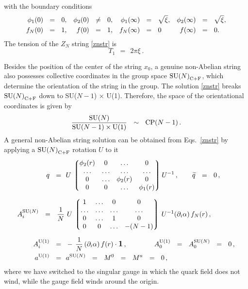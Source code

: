 \documentclass[12pt]{article}
\def\beq{\begin{equation}}
\def\eeq{\end{equation}}
\newcommand{\p}{\partial}
\newcommand{\wt}{\widetilde}
\newcommand{\lgr}{\left\lgroup}
\newcommand{\rgr}{\right\rgroup}
\def\cfl {$\text{SU($N$)}_{\rm C+F}$ }
\def\cfln {$\text{SU($N$)}_{\rm C+F}$}
\newcommand{\aU}{a^{\rm U(1)}}
\newcommand{\aN}{a^\text{SU($N$)}}
\begin{document}
	with the boundary conditions
\begin{align}
%
\label{boundary}
	\phi_1(0) & ~~=~~  0\text,                   & \phi_2(0) & ~~\neq~~ 0\text,  &
	\phi_1(\infty) & ~~=~~ \sqrt{\xi} \text,     & \phi_2(\infty) & ~~=~~ \sqrt{\xi}\text, \\
%
\notag
	f_{N}(0) & ~~=~~ 1\text,                   & f(0) & ~~=~~ 1\text,   &
	f_{N}(\infty) & ~~=~~ 0 \text\,            &  f(\infty) & ~~=~~ 0\text.
\end{align}
	The tension of the $ Z_N $ string \eqref{znstr} is 
\[
	T_1  ~~=~~ 2\pi\xi~.
\]
	
	Besides the position of the center of the string $ x_0 $, a genuine non-Abelian string 
	also possesses collective coordinates in the group space \cfln, which determine the orientation 
	of the string in the group.	
	The solution \eqref{znstr} breaks \cfl down to SU($N-1$) $\times$ U(1).
	Therefore, the space of the orientational coordinates is given by 
\beq
\label{modulispace}
	\frac{\text{SU($N$)}}
            {\text{SU($N-1$)} \times {\rm U(1)}}         ~~\sim~~  \text{CP($N-1$)}\,.
\eeq
	A general non-Abelian string solution can be obtained from Eqs.~\eqref{znstr} by applying
	a \cfl rotation $ U $ to it
\begin{align}
%
\notag
	q ~~=~~ & U\, \lgr \begin{matrix}
			   	\phi_2(r)  & 0  & \ldots & 0 \\
				\ldots  &  \ldots & \ldots & \ldots \\
				0  & \ldots      & \phi_2(r) &  0 \\
				0  & 0           & \ldots  &  \phi_1(r) 
			   \end{matrix}        \rgr     
			U^{-1} \,,
		\qquad \wt{q} ~~=~~ 0\,,
		\\[2mm]
%
\label{nastr}
%
	A_i^\text{SU($N$)} ~~=~~ \frac{1}{N}\, &\, U\, \lgr \begin{matrix}
					          	1  & \ldots & 0 & 0 \\
						  	\ldots & \ldots & \ldots & \ldots \\
							0  & \ldots  & 1  &  0 \\
							0  & 0   & \ldots  &  - (N-1) 
					         \end{matrix} \rgr  \, U^{-1} (\p_i \alpha)\, f_{N}(r)\,,  \\[2mm]
%
\notag
	A_i^{\rm U(1)} ~~=~~ & -\,\frac{1}{N}\, (\p_i \alpha)\, f(r) \cdot \mathlarger{\mathbf{1}}\,,
	\qquad\qquad
			A_0^{\rm U(1)} ~~=~~ A_0^\text{SU($N$)} ~~=~~ 0\,,
	\\
%
\notag
	\aU ~~=~~ & \aN ~~=~~ M^0 ~~=~~ M^a ~~=~~ 0\,,
\end{align}
	where we have switched to the singular gauge in which the quark field does not wind, while the
	gauge field winds around the origin.
\end{document}
